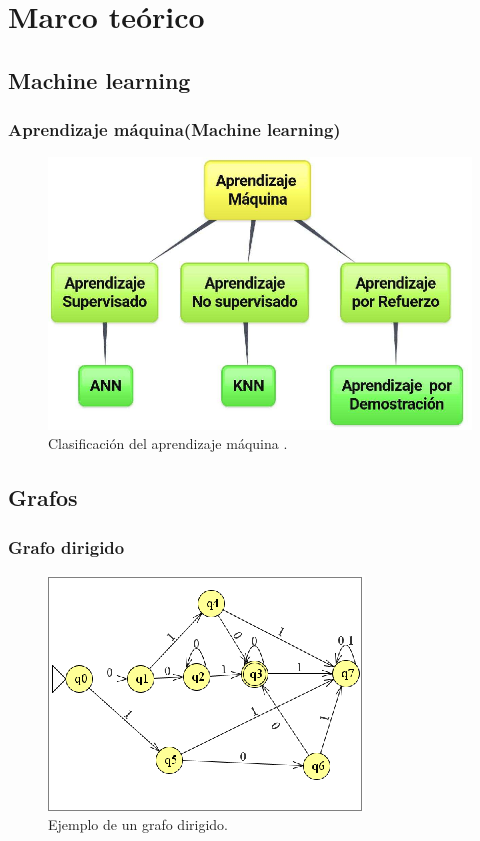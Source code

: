 \section{Marco te\'orico}

\subsection{Machine learning}
\begin{frame}
\frametitle{Aprendizaje m\'aquina(Machine learning)}

\begin{figure}[h]
\centering
\includegraphics[width=0.8\columnwidth]{Imagenes/Aprendizaje.eps}
\caption{Clasificación del aprendizaje m\'aquina
 \cite{9780471056690, 9780387310732}.}
\label{fig:ClasifML}
\end{figure}

\end{frame} 


\subsection{Grafos}
\begin{frame}
\frametitle{Grafo dirigido}

\begin{figure}[h]
\centering
\includegraphics[width=0.7\columnwidth]{Imagenes/GrafoDirigido.eps}
\caption{Ejemplo de un grafo dirigido.}
\label{fig:grafod}
\end{figure}

\end{frame} 


